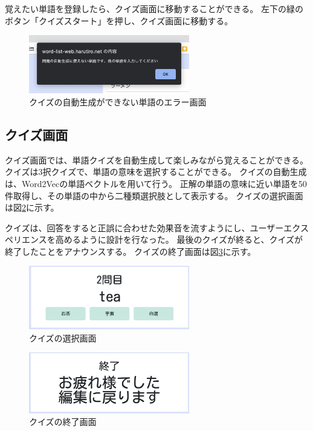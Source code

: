 \documentclass[11pt,a4paper]{jsarticle}
\begin{document}
覚えたい単語を登録したら、クイズ画面に移動することができる。
左下の緑のボタン「クイズスタート」を押し、クイズ画面に移動する。

\begin{figure}[htbp]
    \begin{center}
        \includegraphics[width=70mm]{./img/error_popup.png}
    \end{center}
    \caption{クイズの自動生成ができない単語のエラー画面}
    \label{fig:quiz_error}
\end{figure}



\subsection{クイズ画面}
クイズ画面では、単語クイズを自動生成して楽しみながら覚えることができる。
クイズは3択クイズで、単語の意味を選択することができる。
クイズの自動生成は、Word2Vecの単語ベクトルを用いて行う。
正解の単語の意味に近い単語を50件取得し、その単語の中から二種類選択肢として表示する。
クイズの選択画面は図\ref{fig:quiz}に示す。

クイズは、回答をすると正誤に合わせた効果音を流すようにし、ユーザーエクスペリエンスを高めるように設計を行なった。
最後のクイズが終ると、クイズが終了したことをアナウンスする。
クイズの終了画面は図\ref{fig:quiz_end}に示す。



\begin{figure}[htbp]
    \begin{center}
        \includegraphics[width=70mm]{./img/question.png}
    \end{center}
    \caption{クイズの選択画面}
    \label{fig:quiz}
\end{figure}


\begin{figure}[htbp]
    \begin{center}
        \includegraphics[width=70mm]{./img/question_end.png}
    \end{center}
    \caption{クイズの終了画面}
    \label{fig:quiz_end}
\end{figure}
\end{document}
